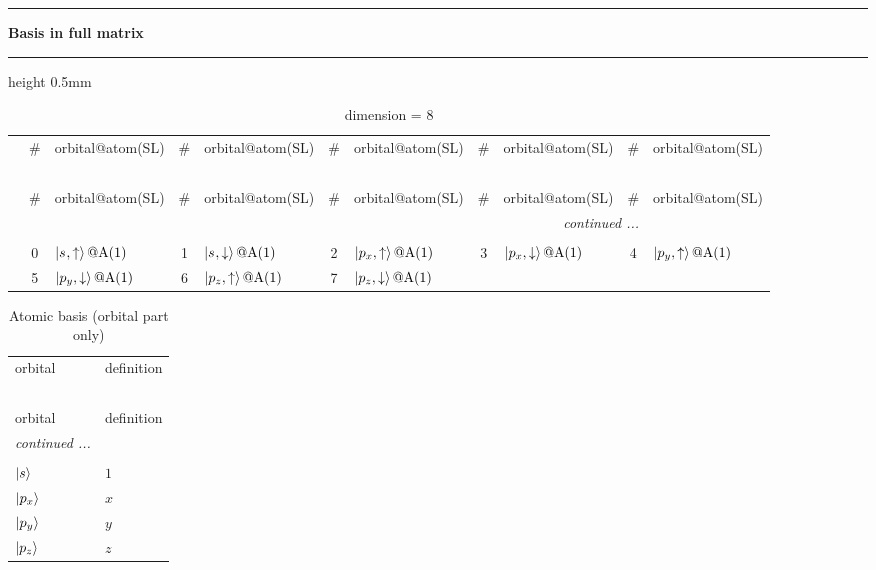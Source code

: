 \documentclass[fleqn,10pt,landscape]{jsarticle}
\begin{document}
\vspace{5mm}
\noindent \rule[0.5mm]{5mm}{0.5mm}\hspace{3mm}\textbf{Basis in full matrix}\hspace{3mm}\leaders\hrule height 0.5mm\hfill\kern0pt
\vspace{3mm}

\renewcommand{\arraystretch}{1.6}
\begin{longtable}[l]{c|cl|cl|cl|cl|cl}
\captionsetup{justification=raggedright, singlelinecheck=off}
\caption{dimension = 8}
 \\
 \hline \hline
 & \# & orbital@atom(SL) & \# & orbital@atom(SL) & \# & orbital@atom(SL) & \# & orbital@atom(SL) & \# & orbital@atom(SL) \\ \hline \endfirsthead

\multicolumn{10}{l}{\tablename\ \thetable{}} \\
 \hline \hline
 & \# & orbital@atom(SL) & \# & orbital@atom(SL) & \# & orbital@atom(SL) & \# & orbital@atom(SL) & \# & orbital@atom(SL) \\ \hline \endhead

 \hline \hline
\multicolumn{10}{r}{\footnotesize\it continued ...} \\ \endfoot

 \hline \hline
\multicolumn{10}{r}{} \\ \endlastfoot

 & 0 & $\ket{s_{},\uparrow}@{\rm A}(1)$ & 1 & $\ket{s_{},\downarrow}@{\rm A}(1)$ & 2 & $\ket{p_{x},\uparrow}@{\rm A}(1)$ & 3 & $\ket{p_{x},\downarrow}@{\rm A}(1)$ & 4 & $\ket{p_{y},\uparrow}@{\rm A}(1)$ \\
& 5 & $\ket{p_{y},\downarrow}@{\rm A}(1)$ & 6 & $\ket{p_{z},\uparrow}@{\rm A}(1)$ & 7 & $\ket{p_{z},\downarrow}@{\rm A}(1)$ &  &  &  &  \\
\end{longtable}
\renewcommand{\arraystretch}{1.6}
\begin{longtable}[l]{ll}
\captionsetup{justification=raggedright, singlelinecheck=off}
\caption{Atomic basis (orbital part only)}
 \\
 \hline \hline
orbital & definition \\ \hline \endfirsthead

\multicolumn{1}{l}{\tablename\ \thetable{}} \\
 \hline \hline
orbital & definition \\ \hline \endhead

 \hline \hline
\multicolumn{1}{r}{\footnotesize\it continued ...} \\ \endfoot

 \hline \hline
\multicolumn{1}{r}{} \\ \endlastfoot

$ \ket{s} $ & $ 1 $ \\ \hline
$ \ket{p_{x}} $ & $ x $ \\
$ \ket{p_{y}} $ & $ y $ \\
$ \ket{p_{z}} $ & $ z $ \\
\end{longtable}
\end{document}
